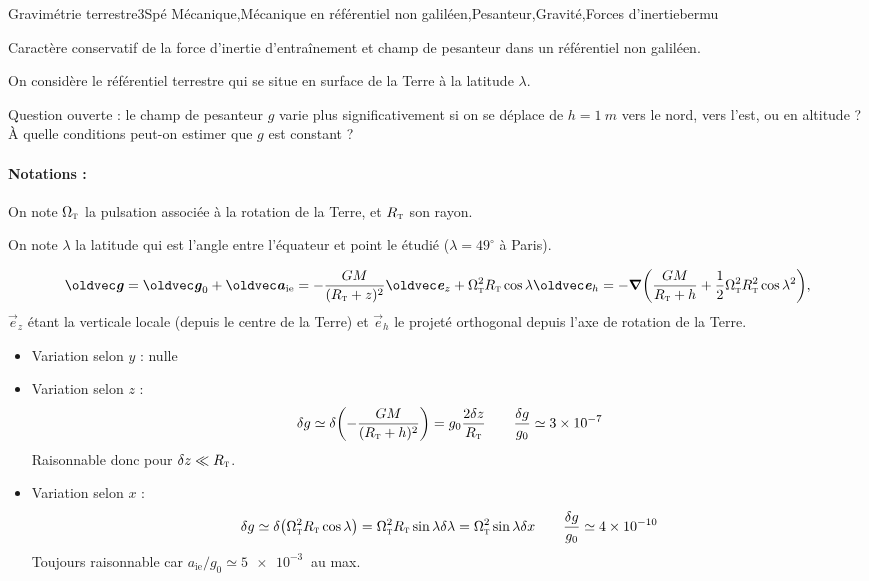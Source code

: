 
\begin{exercise}{Gravimétrie terrestre}{3}{Spé}
{Mécanique,Mécanique en référentiel non galiléen,Pesanteur,Gravité,Forces d'inertie}{bermu}

\begin{questions}
    \questioncours Caractère conservatif de la force d'inertie d’entraînement et champ de pesanteur dans un référentiel non galiléen. 
    
\begin{EnvUplevel}
On considère le référentiel terrestre qui se situe en surface de la Terre à la latitude $\lambda$.

\end{EnvUplevel}
    \question \textsf{Question ouverte :} le champ de pesanteur $g$ varie plus significativement si on se déplace de $h = \SI{1}{m}$ vers le nord, vers l'est, ou en altitude ? \`A quelle conditions peut-on estimer que $g$ est constant ?
\end{questions}
\paragraph{Notations :} 
On note $\Omega_\textsc{t}$ la pulsation associée à la rotation de la Terre, et $R_\textsc{t}$ son rayon.

\hspace{4.3em}
On note $\lambda$ la latitude qui est l'angle entre l'équateur et point le étudié ($\lambda = 49^\circ$ à Paris).
\end{exercise}

\begin{solution}
\begin{questions}
    \questioncours $$\vec{g} = \vec{g}_0 + \vec{a}_\text{ie} = -\dfrac{GM}{(R_\textsc{t}+z)^2}\vec{e}_z + \Omega^2_\textsc{t} R_\textsc{t} \cos\lambda \vec{e}_h = -\grad\qty(\dfrac{GM}{R_\textsc{t}+h} + \dfrac{1}{2}\Omega^2_\textsc{t} R_\textsc{t}^2 \cos\lambda^2),$$
$\vec{e}_z$ étant la verticale locale (depuis le centre de la Terre) et $\vec{e}_h$ le projeté orthogonal depuis l'axe de rotation de la Terre.
    \question
    \begin{itemize}
        \item \textsf{Variation selon $y$ :} nulle
        \item \textsf{Variation selon $z$ :}
        $$\delta g \simeq \delta\qty(-\dfrac{GM}{(R_\textsc{t}+h)^2}) = g_0 \dfrac{2 \delta z}{R_\textsc{t}} \qquad \dfrac{\delta  g}{g_0} \simeq \SI{3e-7}{}$$
        Raisonnable donc pour $\delta z \ll R_\textsc{t}$.
        \item \textsf{Variation selon $x$ :}
        $$\delta g \simeq \delta\qty(\Omega^2_\textsc{t} R_\textsc{t} \cos\lambda) = \Omega^2_\textsc{t} R_\textsc{t} \sin\lambda \delta\lambda = \Omega^2_\textsc{t} \sin\lambda \delta x \qquad \dfrac{\delta  g}{g_0} \simeq \SI{4e-10}{}$$
        Toujours raisonnable car $a_\text{ie}/g_0 \simeq \SI{5e-3}{}$ au max.
    \end{itemize}
\end{questions}
\end{solution}

